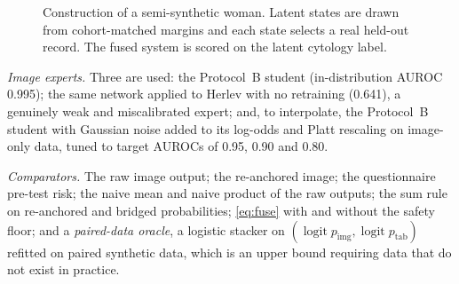 \documentclass[lettersize,journal]{IEEEtran}
\newcommand{\logit}{\operatorname{logit}}
\newcommand{\pimg}{p_{\mathrm{img}}}
\newcommand{\ptab}{p_{\mathrm{tab}}}
\begin{document}
\begin{figure}[t]
\centering
{%
}
\caption{Construction of a semi-synthetic woman. Latent states are drawn from cohort-matched margins and each state selects a real held-out record. The fused system is scored on the latent cytology label.}
\label{fig:synth}
\end{figure}

\emph{Image experts.} Three are used: the Protocol~B student (in-distribution AUROC 0.995); the same network applied to Herlev with no retraining (0.641), a genuinely weak and miscalibrated expert; and, to interpolate, the Protocol~B student with Gaussian noise added to its log-odds and Platt rescaling \cite{platt1999probabilistic} on image-only data, tuned to target AUROCs of 0.95, 0.90 and 0.80.

\emph{Comparators.} The raw image output; the re-anchored image; the questionnaire pre-test risk; the naive mean and naive product of the raw outputs; the sum rule \cite{kittler1998combining} on re-anchored and bridged probabilities; \eqref{eq:fuse} with and without the safety floor; and a \emph{paired-data oracle}, a logistic stacker on $(\logit\pimg,\logit\ptab)$ refitted on paired synthetic data, which is an upper bound requiring data that do not exist in practice.
\end{document}
